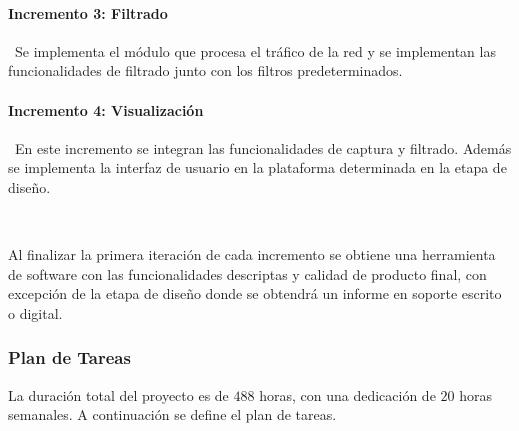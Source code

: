 \paragraph{Incremento 3: Filtrado} \
Se implementa el módulo que procesa el tráfico de la red y se implementan las funcionalidades de filtrado junto con los filtros predeterminados.
\paragraph{Incremento 4: Visualización} \
En este incremento se integran las funcionalidades de captura y filtrado. Además se implementa la interfaz de usuario en la plataforma determinada en la etapa de diseño.

\ \

Al finalizar la primera iteración de cada incremento se obtiene una herramienta de software con las funcionalidades descriptas y calidad de producto final, con excepción de la etapa de diseño donde se obtendrá un informe en soporte escrito o digital.

\newpage

\subsubsection*{Plan de Tareas}

La duración total del proyecto es de $488$ horas, con una dedicación de $20$ horas semanales. A continuación se define el plan de tareas.

